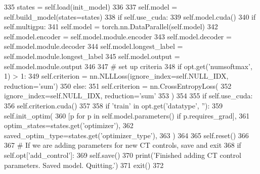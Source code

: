 \begin{DoxyCode}
335                 states = self.load(init\_model)
336 
337             self.model = self.build\_model(states=states)
338             \textcolor{keywordflow}{if} self.use\_cuda:
339                 self.model.cuda()
340                 \textcolor{keywordflow}{if} self.multigpu:
341                     self.model = torch.nn.DataParallel(self.model)
342                     self.model.encoder = self.model.module.encoder
343                     self.model.decoder = self.model.module.decoder
344                     self.model.longest\_label = self.model.module.longest\_label
345                     self.model.output = self.model.module.output
346 
347         \textcolor{comment}{# set up criteria}
348         \textcolor{keywordflow}{if} opt.get(\textcolor{stringliteral}{'numsoftmax'}, 1) > 1:
349             self.criterion = nn.NLLLoss(ignore\_index=self.NULL\_IDX, reduction=\textcolor{stringliteral}{'sum'})
350         \textcolor{keywordflow}{else}:
351             self.criterion = nn.CrossEntropyLoss(
352                 ignore\_index=self.NULL\_IDX, reduction=\textcolor{stringliteral}{'sum'}
353             )
354 
355         \textcolor{keywordflow}{if} self.use\_cuda:
356             self.criterion.cuda()
357 
358         \textcolor{keywordflow}{if} \textcolor{stringliteral}{'train'} \textcolor{keywordflow}{in} opt.get(\textcolor{stringliteral}{'datatype'}, \textcolor{stringliteral}{''}):
359             self.init\_optim(
360                 [p \textcolor{keywordflow}{for} p \textcolor{keywordflow}{in} self.model.parameters() \textcolor{keywordflow}{if} p.requires\_grad],
361                 optim\_states=states.get(\textcolor{stringliteral}{'optimizer'}),
362                 saved\_optim\_type=states.get(\textcolor{stringliteral}{'optimizer\_type'}),
363             )
364 
365         self.reset()
366 
367         \textcolor{comment}{# If we are adding parameters for new CT controls, save and exit}
368         \textcolor{keywordflow}{if} self.opt[\textcolor{stringliteral}{'add\_control'}]:
369             self.save()
370             print(\textcolor{stringliteral}{'Finished adding CT control parameters. Saved model. Quitting.'})
371             exit()
372 
\end{DoxyCode}


